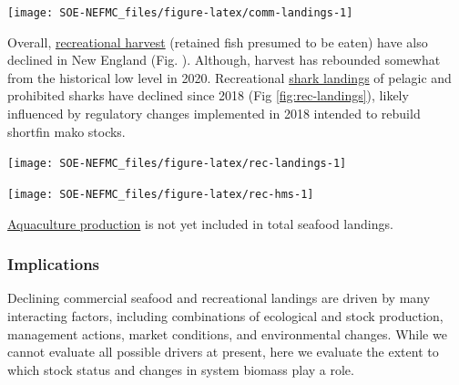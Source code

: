 \documentclass[
  10pt,
]{article}
\let\origfigure\figure
\let\endorigfigure\endfigure
\renewenvironment{figure}[1][2] {
    \expandafter\origfigure\expandafter[H]
} {
    \endorigfigure
}
\begin{document}
\begin{figure}

{\centering \texttt{[image: SOE-NEFMC\_files/figure-latex/comm-landings-1]} 

}

\caption{Total commercial landings (black) and NEFMC managed U.S seafood landings (red) by feeding guild for the Gulf of Maine.}\label{fig:comm-landings}
\end{figure}

Overall, \href{https://noaa-edab.github.io/catalog/recreational-fishing-indicators.html}{recreational harvest} (retained fish presumed to be eaten) have also declined in New England (Fig. ). Although, harvest has rebounded somewhat from the historical low level in 2020. Recreational \href{https://noaa-edab.github.io/catalog/highly-migratory-species-landings.html}{shark landings} of pelagic and prohibited sharks have declined since 2018 (Fig \ref{fig:rec-landings}), likely influenced by regulatory changes implemented in 2018 intended to rebuild shortfin mako stocks.

\begin{figure}

{\centering \texttt{[image: SOE-NEFMC\_files/figure-latex/rec-landings-1]} 

}

\caption{Total recreational seafood harvest (millions of pounds) in the New England region.}\label{fig:rec-landings}
\end{figure}
\begin{figure}

{\centering \texttt{[image: SOE-NEFMC\_files/figure-latex/rec-hms-1]} 

}

\caption{Recreational shark landings from Large Pelagics Survey.}\label{fig:rec-hms}
\end{figure}

\href{https://noaa-edab.github.io/catalog/aquaculture-production.html}{Aquaculture production} is not yet included in total seafood landings.

\hypertarget{implications}{%
\subsubsection{Implications}\label{implications}}

Declining commercial seafood and recreational landings are driven by many interacting factors, including combinations of ecological and stock production, management actions, market conditions, and environmental changes. While we cannot evaluate all possible drivers at present, here we evaluate the extent to which stock status and changes in system biomass play a role.
\end{document}
